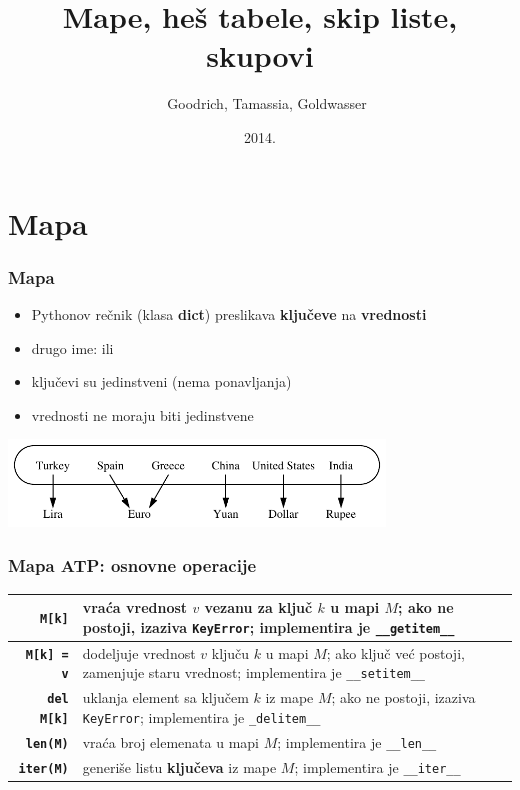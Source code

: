 \documentclass[compress]{beamer}
\title{Mape, heš tabele, skip liste, skupovi}
\author{\textcopyright \ \ Goodrich, Tamassia, Goldwasser}
\institute{Katedra za informatiku, Fakultet tehničkih nauka, Univerzitet u
Novom Sadu}
\date{2014.}
\begin{document}
\frame{\titlepage}

\section[Mapa]{Mapa}
\begin{frame}[fragile]
  \frametitle{Mapa}
  \begin{itemize}
    \item Pythonov rečnik (klasa \textbf{dict}) preslikava \textbf{ključeve} na \textbf{vrednosti} 
    \item drugo ime:  ili 
    \item ključevi su jedinstveni (nema ponavljanja)
    \item vrednosti ne moraju biti jedinstvene
  \end{itemize}
  \begin{center}
    \includegraphics[width=10cm]{asp-10-pic01.pdf}
  \end{center}
\end{frame}

\begin{frame}[fragile]
  \frametitle{Mapa ATP: osnovne operacije}
  \begin{center}
    \begin{tabular}{rp{8cm}}
      \textbf{\texttt{M[k]}} & vraća vrednost $v$ vezanu za ključ $k$ u mapi $M$; ako ne postoji, izaziva \texttt{KeyError}; implementira je \texttt{\_\_getitem\_\_} \\ \hline
      \textbf{\texttt{M[k] = v}} & dodeljuje vrednost $v$ ključu $k$ u mapi $M$; ako ključ već postoji, zamenjuje staru vrednost; implementira je \texttt{\_\_setitem\_\_} \\ \hline
      \textbf{\texttt{del M[k]}} & uklanja element sa ključem $k$ iz mape $M$; ako ne postoji, izaziva \texttt{KeyError}; implementira je \texttt{\_delitem\_\_} \\ \hline
      \textbf{\texttt{len(M)}} & vraća broj elemenata u mapi $M$; implementira je \texttt{\_\_len\_\_} \\ \hline
      \textbf{\texttt{iter(M)}} & generiše listu \textbf{ključeva} iz mape $M$;  implementira je \texttt{\_\_iter\_\_} \\
    \end{tabular}
  \end{center}
\end{frame}
\end{document}
